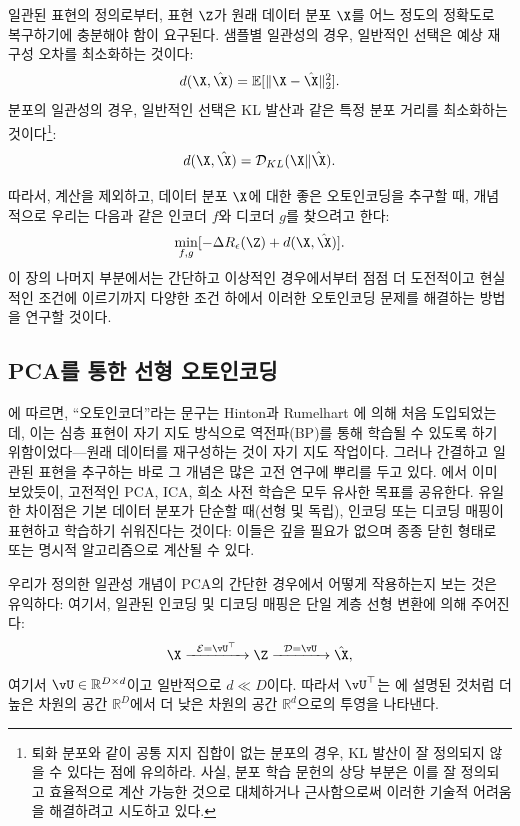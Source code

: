 \documentclass[../../book-main_ko.tex]{subfiles}
\begin{document}
일관된 표현의 정의로부터, 표현 $\Z$가 원래 데이터 분포 $\X$를 어느 정도의 정확도로 복구하기에 충분해야 함이 요구된다. 샘플별 일관성의 경우, 일반적인 선택은 예상 재구성 오차를 최소화하는 것이다:
\begin{equation}
  d(\X, \hat \X) = \mathbb{E}[\|\X - \hat\X\|_2^2].
\end{equation}
분포의 일관성의 경우, 일반적인 선택은 KL 발산과 같은 특정 분포 거리를 최소화하는 것이다\footnote{퇴화 분포와 같이 공통 지지 집합이 없는 분포의 경우, KL 발산이 잘 정의되지 않을 수 있다는 점에 유의하라. 사실, 분포 학습 문헌의 상당 부분은 이를 잘 정의되고 효율적으로 계산 가능한 것으로 대체하거나 근사함으로써 이러한 기술적 어려움을 해결하려고 시도하고 있다.}: 
\begin{equation}
  d(\X, \hat \X) = \mathcal{D}_{KL}(\X\|\hat\X).
\end{equation}

따라서, 계산을 제외하고, 데이터 분포 $\X$에 대한 좋은 오토인코딩을 추구할 때, 개념적으로 우리는 다음과 같은 인코더 $f$와 디코더 $g$를 찾으려고 한다:
\begin{equation}
  \min_{f, g} [- \Delta R_{\epsilon}(\Z) + d(\X, \hat \X)].
  \label{eqn:autoencode-objective-ch5}
\end{equation}
이 장의 나머지 부분에서는 간단하고 이상적인 경우에서부터 점점 더 도전적이고 현실적인 조건에 이르기까지 다양한 조건 하에서 이러한 오토인코딩 문제를 해결하는 방법을 연구할 것이다.

\subsection{PCA를 통한 선형 오토인코딩}
\cite{Baldi2011}에 따르면, ``오토인코더''라는 문구는 Hinton과 Rumelhart \cite{Rumelhart1986}에 의해 처음 도입되었는데, 이는 심층 표현이 자기 지도 방식으로 역전파(BP)를 통해 학습될 수 있도록 하기 위함이었다—원래 데이터를 재구성하는 것이 자기 지도 작업이다. 그러나 간결하고 일관된 표현을 추구하는 바로 그 개념은 많은 고전 연구에 뿌리를 두고 있다. 에서 이미 보았듯이, 고전적인 PCA, ICA, 희소 사전 학습은 모두 유사한 목표를 공유한다. 유일한 차이점은 기본 데이터 분포가 단순할 때(선형 및 독립), 인코딩 또는 디코딩 매핑이 표현하고 학습하기 쉬워진다는 것이다: 이들은 깊을 필요가 없으며 종종 닫힌 형태로 또는 명시적 알고리즘으로 계산될 수 있다.

우리가 정의한 일관성 개념이 PCA의 간단한 경우에서 어떻게 작용하는지 보는 것은 유익하다: 여기서, 일관된 인코딩 및 디코딩 매핑은 단일 계층 선형 변환에 의해 주어진다:
\begin{equation}
  \X \xrightarrow{\hspace{2mm} \mathcal{E} = \vU^\top \hspace{2mm}}
  \Z \xrightarrow{\hspace{2mm} \mathcal{D} = \vU \hspace{2mm}}   \hat{\X},
  \label{eqn:autoencoding-PCA-2}
\end{equation}
여기서 $\vU \in \mathbb{R}^{D\times d}$이고 일반적으로 $d\ll D$이다. 따라서 $\vU^\top$는 에 설명된 것처럼 더 높은 차원의 공간 $\mathbb{R}^{D}$에서 더 낮은 차원의 공간 $\mathbb{R}^{d}$으로의 투영을 나타낸다.
\end{document}
